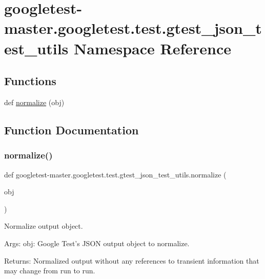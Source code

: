 \hypertarget{namespacegoogletest-master_1_1googletest_1_1test_1_1gtest__json__test__utils}{}\section{googletest-\/master.googletest.\+test.\+gtest\+\_\+json\+\_\+test\+\_\+utils Namespace Reference}
\label{namespacegoogletest-master_1_1googletest_1_1test_1_1gtest__json__test__utils}
\subsection*{Functions}
\begin{DoxyCompactItemize}
\item 
def \mbox{\hyperlink{namespacegoogletest-master_1_1googletest_1_1test_1_1gtest__json__test__utils_a4d47d93af2a7ae4ec52c8ca37a9965b8}{normalize}} (obj)
\end{DoxyCompactItemize}


\subsection{Function Documentation}
\mbox{\label{namespacegoogletest-master_1_1googletest_1_1test_1_1gtest__json__test__utils_a4d47d93af2a7ae4ec52c8ca37a9965b8}} 
\subsubsection{\texorpdfstring{normalize()}{normalize()}}
{\footnotesize\ttfamily def googletest-\/master.\+googletest.\+test.\+gtest\+\_\+json\+\_\+test\+\_\+utils.\+normalize (\begin{DoxyParamCaption}\item[{}]{obj }\end{DoxyParamCaption})}

\begin{DoxyVerb}Normalize output object.

Args:
   obj: Google Test's JSON output object to normalize.

Returns:
   Normalized output without any references to transient information that may
   change from run to run.
\end{DoxyVerb}
 